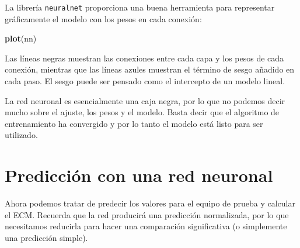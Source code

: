 \documentclass[]{book}
\newenvironment{Shaded}{\begin{snugshade}}{\end{snugshade}}
\newcommand{\KeywordTok}[1]{\textcolor[rgb]{0.13,0.29,0.53}{\textbf{#1}}}
\newcommand{\DecValTok}[1]{\textcolor[rgb]{0.00,0.00,0.81}{#1}}
\newcommand{\StringTok}[1]{\textcolor[rgb]{0.31,0.60,0.02}{#1}}
\newcommand{\OperatorTok}[1]{\textcolor[rgb]{0.81,0.36,0.00}{\textbf{#1}}}
\newcommand{\NormalTok}[1]{#1}
\begin{document}
La librería \texttt{neuralnet} proporciona una buena herramienta para
representar gráficamente el modelo con los pesos en cada conexión:

\begin{Shaded}
\begin{Highlighting}[]
\KeywordTok{plot}\NormalTok{(nn)}
\end{Highlighting}
\end{Shaded}

Las líneas negras muestran las conexiones entre cada capa y los pesos de
cada conexión, mientras que las líneas azules muestran el término de
sesgo añadido en cada paso. El sesgo puede ser pensado como el
intercepto de un modelo lineal.

La red neuronal es esencialmente una caja negra, por lo que no podemos
decir mucho sobre el ajuste, los pesos y el modelo. Basta decir que el
algoritmo de entrenamiento ha convergido y por lo tanto el modelo está
listo para ser utilizado.

\section{Predicción con una red
neuronal}\label{predicciuxf3n-con-una-red-neuronal}

Ahora podemos tratar de predecir los valores para el equipo de prueba y
calcular el ECM. Recuerda que la red producirá una predicción
normalizada, por lo que necesitamos reducirla para hacer una comparación
significativa (o simplemente una predicción simple).

\begin{Shaded}
\end{Shaded}
\end{document}
